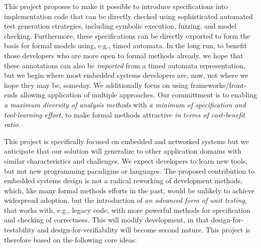 This project proposes to make it possible to introduce specifications into implementation code that can be directly checked using sophisticated automated test generation strategies, including symbolic execution, fuzzing,  and model checking.   Furthermore, these specifications can be directly exported to form the basis for formal models using, e.g., timed automata.  In the long run, to benefit those developers who are more open to formal methods already, we hope that these annotations can also be \emph{imported} from a timed automata representation, but we begin where most embedded systems developers are, now, not where we hope they may be, someday.
We additionally focus on using frameworks/front-ends allowing application of multiple approaches.  Our committment is to enabling \emph{a maximum diversity of analysis methods} with \emph{a minimum of specification and tool-learning effort}, to make formal methods attractive \emph{in terms of cost-benefit ratio}.

This project is specifically focused on embedded and networked systems but we anticipate that our solution will generalize to other application domains with similar characteristics and challenges.
We expect developers to learn new tools, but not new programming paradigms or languages.  The proposed contribution to embedded systems design is not a radical reworking of development methods, which, like many formal methods efforts in the past, would be unlikely to achieve widespread adoption, but the introduction of \emph{an advanced form of unit testing}, that works with, e.g., legacy code, with more powerful methods for specification and checking of correctness. This will modify development, in that design-for-testability and design-for-verifiability will become second nature.  This project is therefore based on the following core ideas:

\noindent{}

